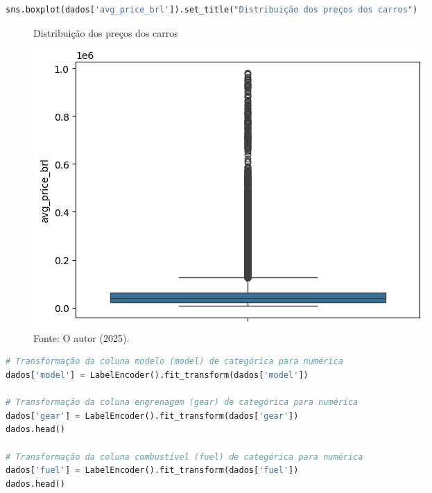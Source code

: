 \begin{lstlisting}[language=Python, style=input]
sns.boxplot(dados['avg_price_brl']).set_title("Distribuição dos preços dos carros") 
\end{lstlisting}
\begin{figure}[H]
\centering
\caption{Distribuição dos preços dos carros}
\includegraphics[width=.8\linewidth]{apendices/fig/2_IAA002_6.png}
\caption*{Fonte: O autor (2025).}
\end{figure}
\begin{lstlisting}[language=Python, style=input]
# Transformação da coluna modelo (model) de categórica para numérica
dados['model'] = LabelEncoder().fit_transform(dados['model']) 

# Transformação da coluna engrenagem (gear) de categórica para numérica
dados['gear'] = LabelEncoder().fit_transform(dados['gear']) 
dados.head()

# Transformação da coluna combustível (fuel) de categórica para numérica
dados['fuel'] = LabelEncoder().fit_transform(dados['fuel']) 
dados.head()
\end{lstlisting}
